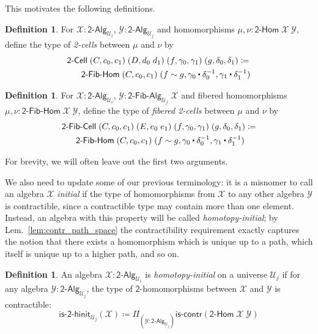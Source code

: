 \documentclass[11pt]{article}
\newcommand{\X}{\mathcal{X}}
\newcommand{\Y}{\mathcal{Y}}
\newcommand{\prd}[1]{\Pi_{#1}}
\newcommand{\defeq}{\coloneqq}
\newcommand{\Bool}{\mathsf{2}}
\newcommand{\UU}{\mathcal{U}}
\newcommand{\BoolAlg}{\mathsf{2}\text{-}\mathsf{Alg}}
\newcommand{\BoolHom}{\mathsf{2}\text{-}\mathsf{Hom}}
\newcommand{\BoolCell}{\mathsf{2}\text{-}\mathsf{Cell}}
\newcommand{\BoolFibCell}{\mathsf{2}\text{-}\mathsf{Fib}\text{-}\mathsf{Cell}}
\newcommand{\BoolFibAlg}{\mathsf{2}\text{-}\mathsf{Fib}\text{-}\mathsf{Alg}}
\newcommand{\BoolFibHom}{\mathsf{2}\text{-}\mathsf{Fib}\text{-}\mathsf{Hom}}
\newcommand{\IsBoolHInit}{\mathsf{is}\text{-}\mathsf{2}\text{-}\mathsf{hinit}}
\newcommand{\iscontr}{\mathsf{is}\text{-}\mathsf{contr}}
\newcommand{\ct}{%
  \mathchoice{\mathbin{\raisebox{0.5ex}{$\displaystyle\centerdot$}}}%
             {\mathbin{\raisebox{0.5ex}{$\centerdot$}}}%
             {\mathbin{\raisebox{0.25ex}{$\scriptstyle\,\centerdot\,$}}}%
             {\mathbin{\raisebox{0.1ex}{$\scriptscriptstyle\,\centerdot\,$}}}}
\theoremstyle{definition}
\newtheorem{definition}[theorem]{Definition}
\begin{document}
This motivates the following definitions.
\begin{definition}\label{def:BoolCell}
For $\X : \BoolAlg_{\UU_i}$, $\Y : \BoolAlg_{\UU_j}$ and homomorphisms $\mu, \nu : \BoolHom \; \X \; \Y$, define the type of \emph{2-cells} between $\mu$ and $\nu$ by
\begin{align*} & \BoolCell \; (C,c_0,c_1) \; (D, d_0 \; d_1) \; (f,\gamma_0,\gamma_1) \; (g,\delta_0,\delta_1) \defeq \\ & \;\;\; \;\;\;\BoolFibHom \; (C,c_0,c_1) \; (f \sim g, \gamma_0 \ct \delta_0^{-1}, \gamma_1 \ct \delta_1^{-1})
\end{align*}
\end{definition}

\begin{definition}\label{def:BoolFibCell}
For $\X : \BoolAlg_{\UU_i}$, $\Y : \BoolFibAlg_{\UU_j} \; \X$ and fibered homomorphisms $\mu, \nu : \BoolFibHom \; \X \; \Y$, define the type of \emph{fibered 2-cells} between $\mu$ and $\nu$ by
\begin{align*} & \BoolFibCell \; (C,c_0,c_1) \; (E, e_0 \; e_1) \; (f,\gamma_0,\gamma_1) \; (g,\delta_0,\delta_1) \defeq \\ & \;\;\; \;\;\;\BoolFibHom \; (C,c_0,c_1) \; (f \sim g, \gamma_0 \ct \delta_0^{-1}, \gamma_1 \ct \delta_1^{-1})
\end{align*}
\end{definition}
For brevity, we will often leave out the first two arguments.

We also need to update some of our previous terminology: it is a misnomer to call an algebra $\X$ \emph{initial} if the type of homomorphisms from $\X$ to any other algebra $\Y$ is contractible, since a contractible type may contain more than one element. Instead, an algebra with this property will be called \emph{homotopy-initial}; by Lem.~\ref{lem:contr_path_space} the contractibility requirement exactly captures the notion that there exists a homomorphism which is unique up to a path, which itself is unique up to a higher path, and so on. 

\begin{definition}\label{def:BoolHInit}
An algebra $\X : \BoolAlg_{\UU_i}$ is \emph{homotopy-initial} on a universe $\UU_j$ if for any algebra $\Y : \BoolAlg_{\UU_j}$, the type of $\Bool$-homomorphisms between $\X$ and $\Y$ is contractible:
\[ \IsBoolHInit_{\UU_j}(\X) \defeq \prd{(\Y:\BoolAlg_{\UU_j})} \iscontr(\BoolHom \; \X \; \Y) \]  
\end{definition}
\end{document}
